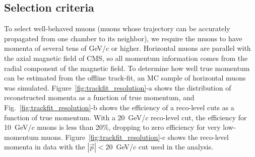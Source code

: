 \documentclass[12pt]{article}
\begin{document}
\subsection{Selection criteria}

To select well-behaved muons (muons whose trajectory can be accurately
propagated from one chamber to its neighbor), we require the muons to
have momenta of several tens of GeV/$c$ or higher.  Horizontal muons
are parallel with the axial magnetic field of CMS, so all momentum
information comes from the radial component of the magnetic field.  To determine how well
true momentum can be estimated from the offline track-fit, an MC
sample of horizontal muons was simulated.
Figure~\ref{fig:trackfit_resolution}-a shows the distribution of
reconstructed momenta as a function of true momentum, and
Fig.~\ref{fig:trackfit_resolution}-b shows the efficiency of a
reco-level cuts as a function of true momentum.  With a 20~GeV/$c$
reco-level cut, the efficiency for 10~GeV/$c$ muons is less than 20\%,
dropping to zero efficiency for very low-momentum muons.
Figure~\ref{fig:trackfit_resolution}-c shows the reco-level momenta in
data with the $|\vec{p}| < 20$~GeV/$c$ cut used in the analysis.
\end{document}
